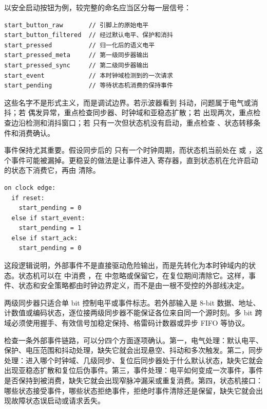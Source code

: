 以安全启动按钮为例，较完整的命名应当区分每一层信号：

\begin{lstlisting}
start_button_raw       // 引脚上的原始电平
start_button_filtered  // 经过默认电平、保护和消抖
start_pressed          // 归一化后的语义电平
start_pressed_meta     // 第一级同步器输出
start_pressed_sync     // 第二级同步器输出
start_event            // 本时钟域检测到的一次请求
start_pending          // 等待状态机消费的保持事件
\end{lstlisting}

这些名字不是形式主义，而是调试边界。若示波器看到  抖动，问题属于电气或消抖；若  偶发异常，重点检查同步器、时钟域和亚稳态扩散；若  出现两次，重点检查边沿检测和消抖窗口；若  只有一次但状态机没有启动，重点检查 、状态转移条件和消费确认。

事件保持尤其重要。假设同步后的  只有一个时钟周期，而状态机当前处在  或 ，这个事件可能被漏掉。更稳妥的做法是让事件进入  寄存器，直到状态机在允许启动的状态下消费它，再由  清除。

\begin{lstlisting}
on clock edge:
  if reset:
    start_pending = 0
  else if start_event:
    start_pending = 1
  else if start_ack:
    start_pending = 0
\end{lstlisting}

这段逻辑说明，外部事件不是直接驱动危险输出，而是先转化为本时钟域内的状态。状态机可以在  中消费 ，在  中忽略或保留它，在复位期间清除它。这样，事件、状态和安全策略都由时钟边界定义，而不是由一根不受控的外部线决定。

\begin{warningbox}
两级同步器只适合单 bit 控制电平或事件标志。若外部输入是 8-bit 数据、地址、计数值或编码状态，逐位接两级同步器不能保证各位来自同一个源时刻。多 bit 跨域必须使用握手、有效信号加稳定保持、格雷码计数器或异步 FIFO 等协议。
\end{warningbox}

检查一条外部事件链路，可以分四个方面逐项确认。第一，电气处理：默认电平、保护、电压范围和抖动处理，缺失它就会出现悬空、抖动和多次触发。第二，同步处理：进入哪个时钟域、几级同步、复位后同步器处于什么默认状态，缺失它就会出现亚稳态扩散和复位后伪事件。第三，事件处理：电平如何变成一次事件，事件是否保持到被消费，缺失它就会出现窄脉冲漏采或重复消费。第四，状态机接口：哪些状态接受事件，哪些状态拒绝事件，拒绝时事件清除还是保留，缺失它就会出现故障状态误启动或请求丢失。

